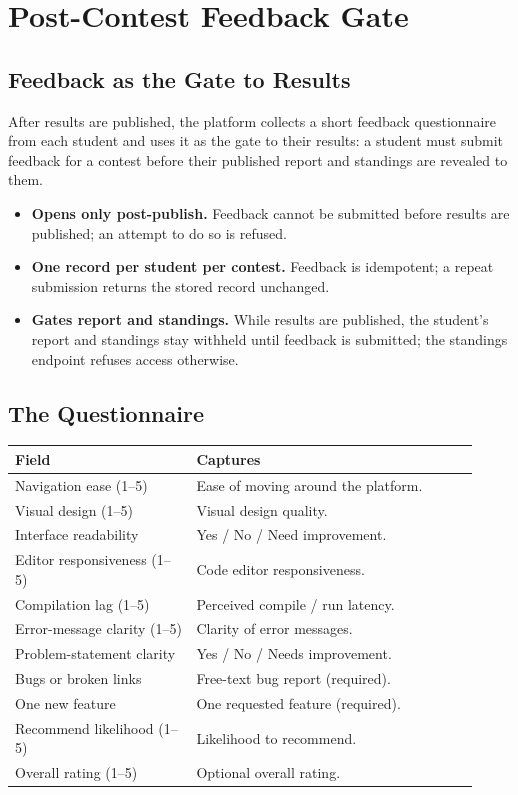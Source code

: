 \documentclass[12pt,a4paper,oneside]{report}
\begin{document}
\chapter{Post-Contest Feedback Gate}
\section{Feedback as the Gate to Results}
After results are published, the platform collects a short feedback questionnaire
from each student and uses it as the gate to their results: a student must submit
feedback for a contest before their published report and standings are revealed
to them.
\begin{itemize}[leftmargin=1.5em]
  \item \textbf{Opens only post-publish.} Feedback cannot be submitted before
        results are published; an attempt to do so is refused.
  \item \textbf{One record per student per contest.} Feedback is idempotent; a
        repeat submission returns the stored record unchanged.
  \item \textbf{Gates report and standings.} While results are published, the
        student's report and standings stay withheld until feedback is submitted;
        the standings endpoint refuses access otherwise.
\end{itemize}

\section{The Questionnaire}
\begin{longtable}{@{}p{0.36\linewidth} p{0.56\linewidth}@{}}
\toprule
\textbf{Field} & \textbf{Captures}\\
\midrule
\endhead
Navigation ease (1--5) & Ease of moving around the platform.\\
Visual design (1--5) & Visual design quality.\\
Interface readability & Yes / No / Need improvement.\\
Editor responsiveness (1--5) & Code editor responsiveness.\\
Compilation lag (1--5) & Perceived compile / run latency.\\
Error-message clarity (1--5) & Clarity of error messages.\\
Problem-statement clarity & Yes / No / Needs improvement.\\
Bugs or broken links & Free-text bug report (required).\\
One new feature & One requested feature (required).\\
Recommend likelihood (1--5) & Likelihood to recommend.\\
Overall rating (1--5) & Optional overall rating.\\
\bottomrule
\end{longtable}
\end{document}
